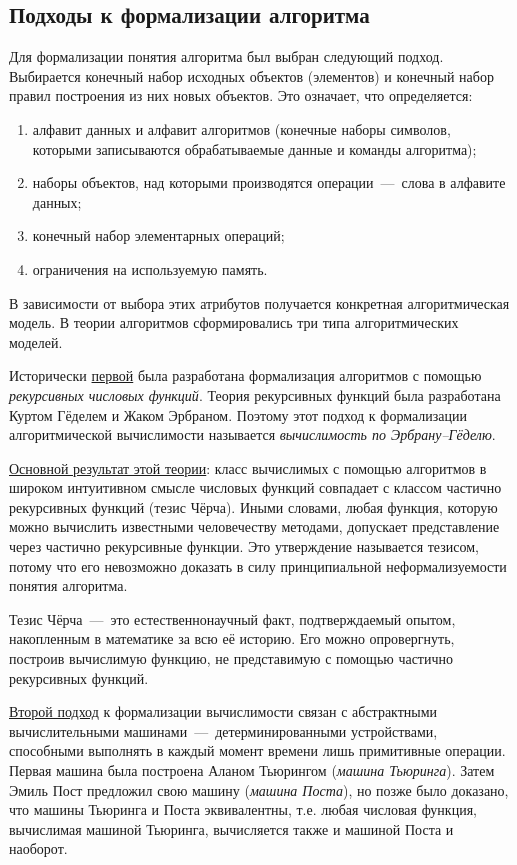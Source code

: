 \subsection{Подходы к формализации алгоритма}
Для формализации понятия алгоритма был выбран следующий подход. Выбирается конечный набор исходных объектов (элементов) и конечный набор правил построения из них новых объектов. Это означает, что определяется:
\begin{enumerate}[label=\arabic*)]
    \item алфавит данных и алфавит алгоритмов (конечные наборы символов, которыми записываются обрабатываемые данные и команды алгоритма);
    \item наборы объектов, над которыми производятся операции~---~слова в алфавите данных;
    \item конечный набор элементарных операций;
    \item ограничения на используемую память.
\end{enumerate}
В зависимости от выбора этих атрибутов получается конкретная алгоритмическая модель. В теории алгоритмов сформировались три типа алгоритмических моделей.

Исторически \underline{первой} была разработана формализация алгоритмов с помощью \textit{рекурсивных числовых функций}. Теория рекурсивных функций была разработана Куртом Гёделем и Жаком Эрбраном. Поэтому этот подход к формализации алгоритмической вычислимости называется \textit{вычислимость по Эрбрану--Гёделю}.

\underline{Основной результат этой теории}: класс вычислимых с помощью алгоритмов в широком интуитивном смысле числовых функций совпадает с классом частично рекурсивных функций (тезис Чёрча). Иными словами, любая функция, которую можно вычислить известными человечеству методами, допускает представление через частично рекурсивные функции. Это утверждение называется тезисом, потому что его невозможно доказать в силу принципиальной неформализуемости понятия алгоритма.

Тезис Чёрча~---~это естественнонаучный факт, подтверждаемый опытом, накопленным в математике за всю её историю. Его можно опровергнуть, построив вычислимую функцию, не представимую с помощью частично рекурсивных функций.

\underline{Второй подход} к формализации вычислимости связан с абстрактными вычислительными машинами~---~детерминированными
устройствами, способными выполнять в каждый момент времени лишь примитивные операции. Первая машина была построена Аланом Тьюрингом (\textit{машина Тьюринга}). Затем Эмиль Пост предложил свою машину (\textit{машина Поста}), но позже было доказано, что машины Тьюринга и Поста эквивалентны, т.е. любая числовая функция, вычислимая машиной Тьюринга, вычисляется также и машиной Поста и наоборот.


